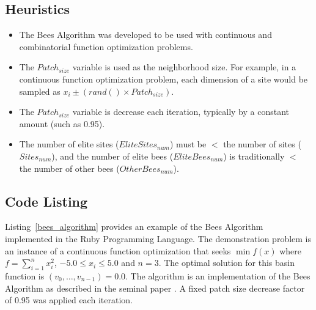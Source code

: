 \subsection{Heuristics}
\begin{itemize}
	\item The Bees Algorithm was developed to be used with continuous and combinatorial function optimization problems.
	\item The $Patch_{size}$ variable is used as the neighborhood size. For example, in a continuous function optimization problem, each dimension of a site would be sampled as $x_i \pm (rand() \times Patch_{size})$.
	\item The $Patch_{size}$ variable is decrease each iteration, typically by a constant amount (such as 0.95).
	\item The number of elite sites ($EliteSites_{num}$) must be $<$ the number of sites ($Sites_{num}$), and the number of elite bees ($EliteBees_{num}$) is traditionally $<$ the number of other bees ($OtherBees_{num}$).
\end{itemize}

\subsection{Code Listing}
Listing~\ref{bees_algorithm} provides an example of the Bees Algorithm implemented in the Ruby Programming Language. 
The demonstration problem is an instance of a continuous function optimization that seeks $\min f(x)$ where $f=\sum_{i=1}^n x_{i}^2$, $-5.0\leq x_i \leq 5.0$ and $n=3$. The optimal solution for this basin function is $(v_0,\ldots,v_{n-1})=0.0$.
The algorithm is an implementation of the Bees Algorithm as described in the seminal paper \cite{Pham2006}. A fixed patch size decrease factor of 0.95 was applied each iteration.

